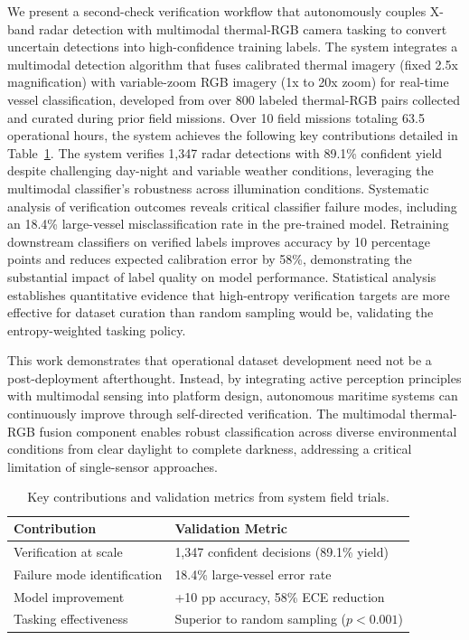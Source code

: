 \documentclass[conf]{asmeconf}
\begin{document}
We present a second-check verification workflow that autonomously couples X-band radar detection with multimodal thermal-RGB camera tasking to convert uncertain detections into high-confidence training labels. The system integrates a multimodal detection algorithm that fuses calibrated thermal imagery (fixed 2.5x magnification) with variable-zoom RGB imagery (1x to 20x zoom) for real-time vessel classification, developed from over 800 labeled thermal-RGB pairs collected and curated during prior field missions. Over 10 field missions totaling 63.5 operational hours, the system achieves the following key contributions detailed in Table~\ref{tab:contributions}. The system verifies 1,347 radar detections with 89.1\% confident yield despite challenging day-night and variable weather conditions, leveraging the multimodal classifier's robustness across illumination conditions. Systematic analysis of verification outcomes reveals critical classifier failure modes, including an 18.4\% large-vessel misclassification rate in the pre-trained model. Retraining downstream classifiers on verified labels improves accuracy by 10 percentage points and reduces expected calibration error by 58\%, demonstrating the substantial impact of label quality on model performance. Statistical analysis establishes quantitative evidence that high-entropy verification targets are more effective for dataset curation than random sampling would be, validating the entropy-weighted tasking policy.

This work demonstrates that operational dataset development need not be a post-deployment afterthought. Instead, by integrating active perception principles with multimodal sensing into platform design, autonomous maritime systems can continuously improve through self-directed verification. The multimodal thermal-RGB fusion component enables robust classification across diverse environmental conditions from clear daylight to complete darkness, addressing a critical limitation of single-sensor approaches.

\begin{table}[t]
\caption{Key contributions and validation metrics from system field trials.}
\label{tab:contributions}
\centering
\small
\begin{tabular}{@{}lp{4.5cm}@{}}
\toprule
Contribution & Validation Metric \\
\midrule
Verification at scale & 1,347 confident decisions (89.1\% yield) \\
\midrule
Failure mode identification & 18.4\% large-vessel error rate \\
\midrule
Model improvement & +10 pp accuracy, 58\% ECE reduction \\
\midrule
Tasking effectiveness & Superior to random sampling ($p<0.001$) \\
\bottomrule
\end{tabular}
\end{table}
\end{document}
